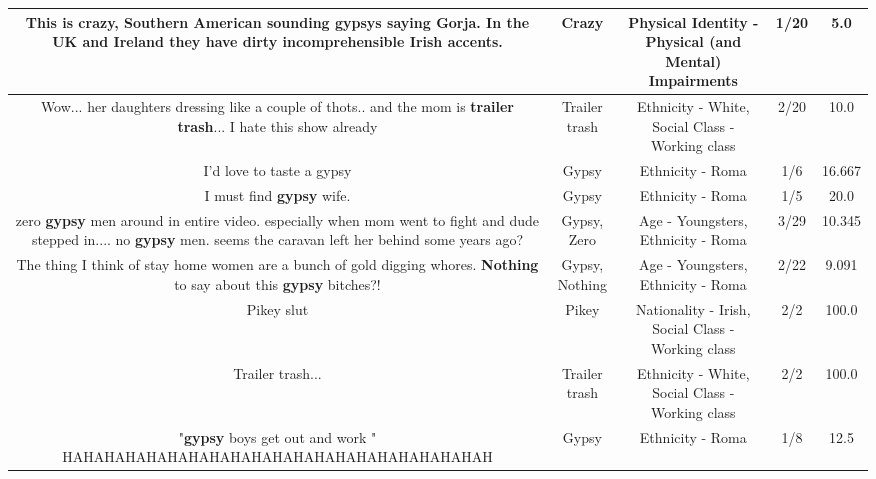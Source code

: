 \documentclass[11pt]{article}
\newlength\mylength
\begin{document}
\begin{center}
\begin{longtable}{|C{.65\mylength}|C{.30\mylength}|C{.12\mylength}|C{.12\mylength}|C{.12\mylength}|}
  \small This is \textbf{crazy}, Southern American sounding gypsys saying Gorja. In the UK and Ireland they have dirty incomprehensible Irish accents.\normalsize   & Crazy & Physical Identity - Physical (and Mental) Impairments & 1/20 & 5.0 \\  \hline
  \small Wow... her daughters dressing like a couple of thots.. and the mom is \textbf{t\textbf{railer trash}}... I hate this show already\normalsize   & Trailer trash & Ethnicity - White, Social Class - Working class & 2/20 & 10.0 \\  \hline
  \small I'd love to taste a gypsy\normalsize   & Gypsy & Ethnicity - Roma & 1/6 & 16.667 \\  \hline
  \small I must find \textbf{gypsy} wife.\normalsize   & Gypsy & Ethnicity - Roma & 1/5 & 20.0 \\  \hline
  \small zero \textbf{gypsy} men around in entire video.  especially when mom went to fight and dude stepped in.... no \textbf{gypsy} men.  seems the caravan left her behind some years ago?\normalsize   & Gypsy, Zero & Age - Youngsters, Ethnicity - Roma & 3/29 & 10.345 \\  \hline
  \small The thing I think of stay home women are a bunch of gold digging whores. \textbf{Nothing} to say about this \textbf{gypsy} bitches?!\normalsize   & Gypsy, Nothing & Age - Youngsters, Ethnicity - Roma & 2/22 & 9.091 \\  \hline
  \small Pikey slut\normalsize   & Pikey & Nationality - Irish, Social Class - Working class & 2/2 & 100.0 \\  \hline
  \small Trailer trash...\normalsize   & Trailer trash & Ethnicity - White, Social Class - Working class & 2/2 & 100.0 \\  \hline
  \small "\textbf{gypsy} boys get out and work " HAHAHAHAHAHAHAHAHAHAHAHAHAHAHAHAHAHAHAHAH\normalsize   & Gypsy & Ethnicity - Roma & 1/8 & 12.5 \\  \hline

\end{longtable}
\end{center}
\end{document}

